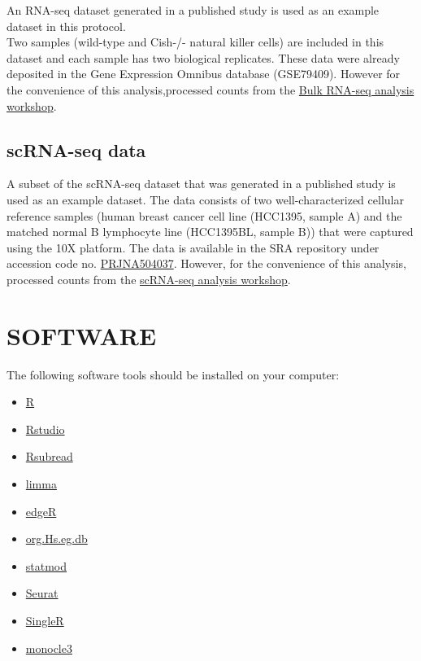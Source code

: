 \documentclass[
  openany]{book}
\providecommand{\tightlist}{%
  \setlength{\itemsep}{0pt}\setlength{\parskip}{0pt}}
\begin{document}
An RNA-seq dataset generated in a published study \citep{delconte2016cis} is used as an example dataset in this protocol.\\

Two samples (wild-type and Cish-/- natural killer cells) are included in this dataset and each sample has two biological replicates. These data were already deposited in the Gene Expression Omnibus database (GSE79409). However for the convenience of this analysis,processed counts from the \href{https://chisangad.github.io/bulkRNAseqtut/index.html}{Bulk RNA-seq analysis workshop}.

\hypertarget{scranseqback}{%
\subsection{scRNA-seq data}\label{scranseqback}}

A subset of the scRNA-seq dataset that was generated in a published study \citep{chen2020multicenter} is used as an example dataset. The data consists of two well-characterized cellular reference samples (human breast cancer cell line (HCC1395, sample A) and the matched normal B lymphocyte line (HCC1395BL, sample B)) that were captured using the 10X platform. The data is available in the SRA repository under accession code no. \href{https://www.ncbi.nlm.nih.gov/bioproject/?term=PRJNA504037}{PRJNA504037}. However, for the convenience of this analysis, processed counts from the \href{https://chisangad.github.io/scRNAseqtut/index.html}{scRNA-seq analysis workshop}.

\hypertarget{software}{%
\section{SOFTWARE}\label{software}}

The following software tools should be installed on your computer:

\begin{itemize}
\tightlist
\item
  \href{https://www.r-project.org}{R}
\item
  \href{https://rstudio.com/}{Rstudio}
\item
  \href{http://bioconductor.org/packages/release/bioc/html/Rsubread.html}{Rsubread}
\item
  \href{http://bioconductor.org/packages/release/bioc/html/limma.html}{limma}
\item
  \href{http://bioconductor.org/packages/release/bioc/html/edgeR.html}{edgeR}
\item
  \href{http://bioconductor.org/packages/release/data/annotation/html/org.Hs.eg.db.html}{org.Hs.eg.db}
\item
  \href{https://CRAN.R-project.org/package=statmod}{statmod}
\item
  \href{https://cloud.r-project.org/package=Seurat}{Seurat}
\item
  \href{https://bioconductor.org/packages/release/bioc/html/SingleR.html}{SingleR}
\item
  \href{https://bioconductor.org/packages/release/bioc/html/monocle.html}{monocle3}
\end{itemize}
\end{document}
